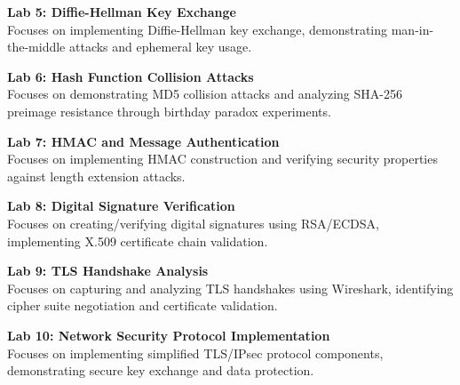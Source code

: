 \vspace{0.2cm}

\noindent\textbf{Lab 5: Diffie-Hellman Key Exchange} \\
Focuses on implementing Diffie-Hellman key exchange, demonstrating man-in-the-middle attacks and ephemeral key usage.

\vspace{0.2cm}

\noindent\textbf{Lab 6: Hash Function Collision Attacks} \\
Focuses on demonstrating MD5 collision attacks and analyzing SHA-256 preimage resistance through birthday paradox experiments.

\vspace{0.2cm}

\noindent\textbf{Lab 7: HMAC and Message Authentication} \\
Focuses on implementing HMAC construction and verifying security properties against length extension attacks.

\vspace{0.2cm}

\noindent\textbf{Lab 8: Digital Signature Verification} \\
Focuses on creating/verifying digital signatures using RSA/ECDSA, implementing X.509 certificate chain validation.

\vspace{0.2cm}

\noindent\textbf{Lab 9: TLS Handshake Analysis} \\
Focuses on capturing and analyzing TLS handshakes using Wireshark, identifying cipher suite negotiation and certificate validation.

\vspace{0.2cm}

\noindent\textbf{Lab 10: Network Security Protocol Implementation} \\
Focuses on implementing simplified TLS/IPsec protocol components, demonstrating secure key exchange and data protection.

\vspace{0.2cm}

\newpage
{}
